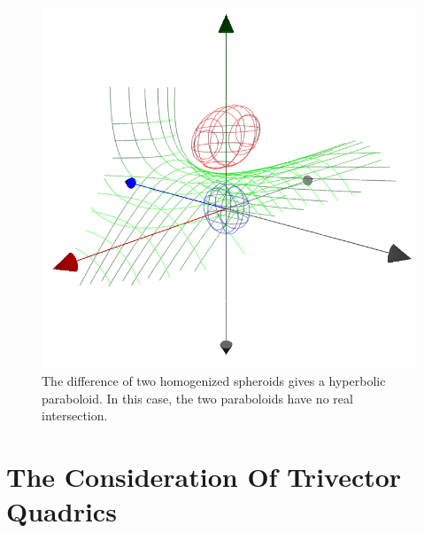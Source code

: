 \documentclass{birkjour}
\theoremstyle{definition}
\theoremstyle{remark}
\numberwithin{equation}{section}
\begin{document}
\begin{figure}
\includegraphics[scale=0.5]{DiffOfSpheroids}
\caption{The difference of two homogenized spheroids gives a hyperbolic paraboloid.
In this case, the two paraboloids have no real intersection.}
\label{fig_diff_of_spheroids}
\end{figure}

\section{The Consideration Of Trivector Quadrics}
\end{document}
